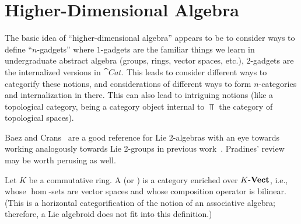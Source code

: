 
\chapter{Higher-Dimensional Algebra}

\begin{node}\label{hda-0000}%
The basic idea of ``higher-dimensional algebra'' appears to be to
consider ways to define ``$n$-gadgets'' where $1$-gadgets are the
familiar things we learn in undergraduate abstract algebra (groups,
rings, vector spaces, etc.), $2$-gadgets are the internalized versions
in $\cat{Cat}$. This leads to consider different ways to categorify
these notions, and considerations of different ways to form
$n$-categories and internalization in there. This can also lead to
intriguing notions (like a topological category, being a category object
internal to $\Top$ the category of topological spaces).
\end{node}

\begin{node}\label{hda-0001}%
Baez and Crans~\cite{baez2010higherdimensional} are a good reference for
Lie 2-algebras with an eye towards working analogously towards Lie
2-groups in previous work~\cite{baez2004higherdimensional}. Pradines'
review~\cite{pradines2007ehresmanns} may be worth perusing as well.
\end{node}

\begin{definition}\label{hda-0002}%
Let $K$ be a commutative ring.
A  (or ) is a category
enriched over $K\textrm{-}\mathbf{Vect}$, i.e., whose
$\hom$-sets are vector spaces and whose composition operator is bilinear.
(This is a horizontal categorification of the notion of an associative
algebra; therefore, a Lie algebroid does not fit into this definition.) 
\end{definition}

